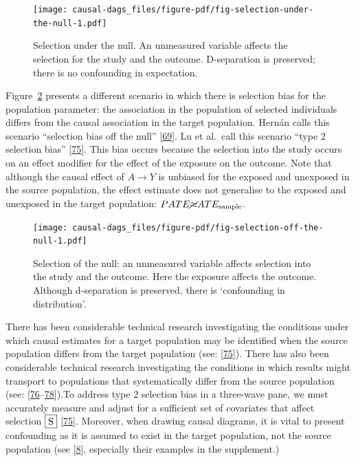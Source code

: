\documentclass[
  singlecolumn]{article}
\begin{document}
\begin{figure}

{\centering \texttt{[image: causal-dags\_files/figure-pdf/fig-selection-under-the-null-1.pdf]}

}

\caption{\label{fig-selection-under-the-null}Selection under the null.
An unmeasured variable affects the selection for the study and the
outcome. D-separation is preserved; there is no confounding in
expectation.}

\end{figure}

Figure~\ref{fig-selection-off-the-null} presents a different scenario in
which there is selection bias for the population parameter: the
association in the population of selected individuals differs from the
causal association in the target population. Hernán calls this scenario
``selection bias off the null''
{[}\protect\hyperlink{ref-hernuxe1n2017}{69}{]}. Lu et al.~call this
scenario ``type 2 selection bias''
{[}\protect\hyperlink{ref-lu2022}{75}{]}. This bias occurs because the
selection into the study occurs on an effect modifier for the effect of
the exposure on the outcome. Note that although the causal effect of
\(A\to Y\) is unbiased for the exposed and unexposed in the source
population, the effect estimate does not generalise to the exposed and
unexposed in the target population:
\(PATE \cancel{\approx} ATE_{\text{sample}}\).

\begin{figure}

{\centering \texttt{[image: causal-dags\_files/figure-pdf/fig-selection-off-the-null-1.pdf]}

}

\caption{\label{fig-selection-off-the-null}Selection of the null: an
unmeasured variable affects selection into the study and the outcome.
Here the exposure affects the outcome. Although d-separation is
preserved, there is `confounding in distribution'.}

\end{figure}

There has been considerable technical research investigating the
conditions under which causal estimates for a target population may be
identified when the source population differs from the target population
(see: {[}\protect\hyperlink{ref-lu2022}{75}{]}). There has also been
considerable technical research investigating the conditions in which
results might transport to populations that systematically differ from
the source population (see:
{[}\protect\hyperlink{ref-bareinboim2022}{76}--\protect\hyperlink{ref-deffner2022}{78}{]}).To
address type 2 selection bias in a three-wave pane, we must accurately
measure and adjust for a sufficient set of covariates that affect
selection \(\framebox{S}\) {[}\protect\hyperlink{ref-lu2022}{75}{]}.
Moreover, when drawing causal diagrams, it is vital to present
confounding as it is assumed to exist in the target population, not the
source population (see {[}\protect\hyperlink{ref-suzuki2020}{8}{]},
especially their examples in the supplement.)
\end{document}
